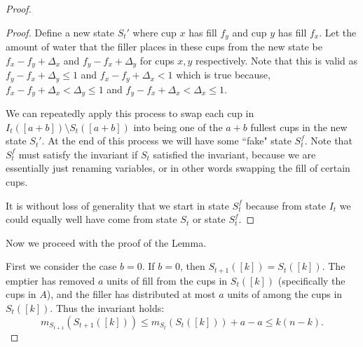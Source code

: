 \documentclass[twocolumn]{article}[11pt]
\begin{document}
\begin{proof}
\begin{proof}
Define a new state $S_t'$ where cup $x$ has fill $f_y$ and cup $y$ has fill $f_x$. 
Let the amount of water that the filler places in these cups from the new state be
$f_x-f_y+\Delta_x$ and $f_y-f_x + \Delta_y$ for cups $x,y$ respectively.
Note that this is valid as $f_y-f_x + \Delta_y\le 1$ and $f_x-f_y+\Delta_x < 1$
which is true because, $f_x-f_y+\Delta_x<\Delta_y \le 1$ and $f_y-f_x + \Delta_x < \Delta_x \le 1$.

We can repeatedly apply this process to swap each cup in $I_t([a+b])\setminus
S_t([a+b])$ into being one of the $a+b$ fullest cups in the new state $S_t'$.
At the end of this process we will have some ``fake" state $S_t^f$. Note that
$S_t^f$ must satisfy the invariant if $S_t$ satisfied the invariant, because we
are essentially just renaming variables, or in other words swapping the fill of
certain cups.

It is without loss of generality that we start in state $S_t^f$ because from
state $I_t$ we could equally well have come from state $S_t$ or state $S_t^f$.
\end{proof}

Now we proceed with the proof of the Lemma.

First we consider the case $b=0$. If $b=0$, then $S_{t+1}([k]) = S_t([k])$. 
The emptier has removed $a$ units of fill from the cups in $S_t([k])$
(specifically the cups in $A$), and the filler has distributed at most $a$
units of among the cups in $S_t([k])$. Thus the invariant holds:
$$m_{S_{t+1}}(S_{t+1}([k])) \le m_{S_t}(S_t([k]))+a-a \le k(n-k).$$


\end{proof}
\end{document}
